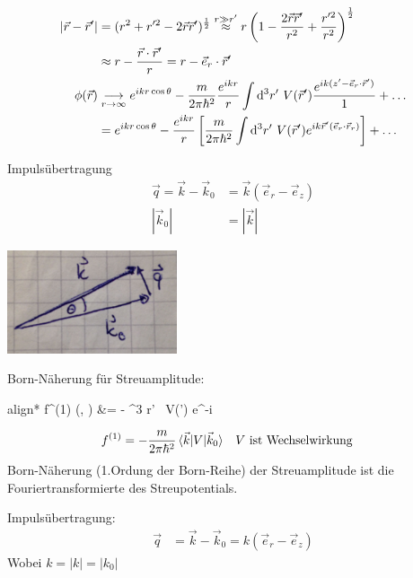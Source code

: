 		\begin{align*}
			|\vec{r} - \vec{r}'| &= (r^2+r'^2 - 2 \vec{r} \vec{r}')^{\frac{1}{2}} 
			\overset{r \gg r'}{\approx}
			r \left(1 - \frac{2 \vec{r} \vec{r}'}{r^2} + \frac{r'^2}{r^2}\right)^{\frac{1}{2}}\\
			&\approx r - \frac{\vec{r} \cdot \vec{r}'}{r} = r - \vec{e}_r \cdot \vec{r}'\\
			\phi (\vec{r}) &\underset{r\rightarrow \infty}{\longrightarrow} 
			e^{ikr \cos \theta} 
			- \frac{m}{2 \pi \hbar^2} \frac{e^{ikr}}{r}
			\int \mathrm{d}^3 r' ~V(\vec{r}') 
			\frac{e^{ik (z' - \vec{e}_r \cdot \vec{r}')}}{1} + \ldots \\
			&= e^{ikr \cos \theta} - \frac{e^{ikr}}{r}
			\left[ \frac{m}{2 \pi \hbar^2} \int \mathrm{d}^3 r' ~V(\vec{r}') 
				e^{ik \vec{r}' (\vec{e}_r \cdot \vec{r}_r)} 
			\right] + \ldots
		\end{align*}
	\begin{minipage}{0.5\textwidth}
	Impulsübertragung
		\begin{align*}
		\vec{q} = \vec{k} - \vec{k}_0 &= \vec{k} (\vec{e}_r - \vec{e}_z) \\
		|\vec{k}_0| &= |\vec{k}|
		\end{align*}
	\end{minipage}
	\hfill
	\begin{minipage}{0.4\textwidth}
		\includegraphics[width=5cm]{Born_Naeherung2}
	\end{minipage}
		
	Born-Näherung für Streuamplitude:
		\begin{empheq}[box=\boxed]{align*}
			f^{(1)} (\theta, \phi) &= - 
			\int \diff^3 r' ~V(') e^{-i  }
		\end{empheq}
		\begin{align*}
			f^{(1)} &= -\frac{m}{2 \pi \hbar^2}  \braket{\vec{k}| V | \vec{k}_0}
			& &V \text{ ist Wechselwirkung}
		\end{align*}
	Born-Näherung (1.Ordung der Born-Reihe) der Streuamplitude ist die Fouriertransformierte des Streupotentials.
	
	Impulsübertragung: 
		\begin{align*}
			\vec{q} &= \vec{k} - \vec{k}_0 
			= k (\vec{e}_r - \vec{e}_z)
		\end{align*}
	Wobei $k = |k| = |k_0|$

